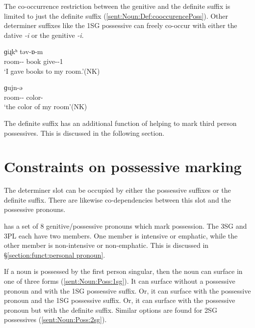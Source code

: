 The co-occurrence restriction between the genitive and the definite suffix is limited to just the definite suffix (\ref{sent:Noun:Def:cooccurencePoss}). Other determiner suffixes like the 1SG possessive can freely co-occur with either the dative \textit{{-i}} or the genitive \textit{{-i}}.


\begin{exe}
	\ex \label{sent:Noun:Def:cooccurencePoss}
	\begin{xlist}
		\ex {} {ɡiɻkʰ} {təv-ɒ-m}
		\\
		room-{\dat}-{\possFsg} book give-{\pst}-1{\sg}
		\\
		\trans	`I gave books to my room.'\hfill (NK)
		\\
		
		\ex {} {ɡujn-ə}
		\\
		room-{\gen}-{\possFsg} color-{}
		\\
		\trans `the color of my room'\hfill (NK)
		\\
	\end{xlist}
\end{exe}


The definite suffix has an additional function of helping to mark third person possessives. This is discussed in the following section. 


\section{Constraints on possessive marking}\label{section:noun:PossMarking}
The determiner slot can be occupied by either the possessive suffixes or the definite suffix. There are likewise co-dependencies between this slot and the possessive pronouns.

{\iaIA} has a set of 8 genitive/possessive pronouns which mark possession. The 3SG and 3PL each have two members. One member is intensive or emphatic, while the other member is non-intensive or non-emphatic. This is discussed in \S\ref{section:funct:personal pronoun}. 


If a noun is possessed by the first person singular, then the noun can surface in one of three forms (\ref{sent:Noun:Poss:1sg}). It can surface without a possessive pronoun and with the 1SG possessive suffix. Or, it can surface with the possessive pronoun and the 1SG possessive suffix. Or, it can   surface with the possessive pronoun but with the definite suffix. Similar options are found for 2SG   possessives (\ref{sent:Noun:Poss:2sg}).\pagebreak


